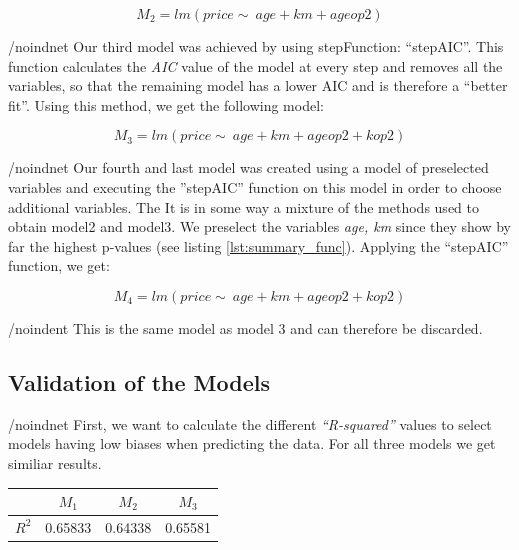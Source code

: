 \begin{equation}\label{eq:model2}
	M_2 = lm(price \sim\ age + km + ageop2)
\end{equation}

/noindnet
Our third model was achieved by using stepFunction: ``stepAIC''. 
This function calculates the \emph{AIC} value of the model at every step and 
removes all the variables, so that the remaining model has a lower AIC and is
therefore a ``better fit''.
Using this method, we get the following model:

\begin{equation}\label{eq:model3}
	M_3 = lm(price \sim\ age + km + ageop2 + kop2)
\end{equation}

/noindnet
Our fourth and last model was created using a model of preselected 
variables and executing the ''stepAIC'' function on this model in order to choose additional variables. The 
It is in some way a mixture of the methods used to obtain model2 and model3. 
We preselect the variables \emph{age, km} since they show by far the highest p-values (see listing \ref{lst:summary_func}). Applying the ``stepAIC'' function, we get: 

\begin{equation}\label{eq:model4}
	M_4 = lm(price \sim\ age + km + ageop2 + kop2)
\end{equation} 

/noindent
This is the same model as model 3 and can therefore be discarded.

\subsection{Validation of the Models} %
\label{sub:validation_of_the_models}

/noindnet
First, we want to calculate the different \emph{``R-squared''} values to select models having low biases when predicting the data. 
For all three models we get similiar results.

\begin{table}[ht]
\begin{center}
\begin{tabular}{ |c|c|c|c| } 
 \hline
 & $M_1$ & $M_2$ & $M_3$ \\ 
 \hline
 $R^2$ &  0.65833 & 0.64338 & 0.65581 \\ 
 \hline
\end{tabular}
\end{center}
\end{table}

